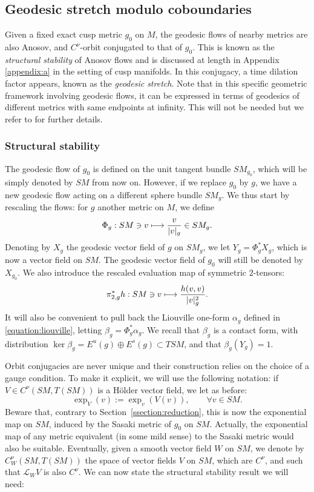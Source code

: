 \documentclass[JEP,XML,SOM,Unicode,NoFloatCountersInSection]{cedram}
\newcommand\mto{\mathchoice{\longmapsto}{\mapsto}{\mapsto}{\mapsto}}
\theoremstyle{plain}
\theoremstyle{definition}
\begin{document}
\subsection{Geodesic stretch modulo coboundaries} Given a fixed exact cusp metric $g_0$ on $M$, the geodesic flows of nearby metrics are also Anosov, and $C^\nu$-orbit conjugated to that of $g_0$. This is known as the \emph{structural stability} of Anosov flows and is discussed at length in Appendix \ref{appendix:a} in the setting of cusp manifolds. In this conjugacy, a time dilation factor appears, known as the \emph{geodesic stretch}. Note that in this specific geometric framework involving geodesic flows, it can be expressed in terms of geodesics of different metrics with same endpoints at infinity. This will not be needed but we refer to \cite{gromov} for further details.

\subsubsection{Structural stability} The geodesic flow of $g_0$ is defined on the unit tangent bundle $SM_{g_0}$, which will be simply denoted by $SM$ from now on. However, if we replace $g_0$ by $g$, we have a new geodesic flow acting on a different sphere bundle $SM_g$. We thus start by rescaling the flows: for $g$ another metric on $M$, we define
\[
\Phi_g : SM \owns v \mto \frac{v}{|v|_g} \in SM_g.
\]
Denoting by $X_g$ the geodesic vector field of $g$ on $SM_g$, we let $Y_g = \Phi_g^\ast X_g$, which is now a vector field on $SM$. The geodesic vector field of $g_0$ will still be denoted by $X_{g_0}$. We also introduce the rescaled evaluation map of symmetric $2$-tensors:
\[
\pi_{2,g}^\ast h : SM \owns v \mto \frac{ h(v,v)}{|v|_g^2}.
\]
It will also be convenient to pull back the Liouville one-form $\alpha_g$ defined in \eqref{equation:liouville}, letting $\beta_g = \Phi_g^\ast \alpha_g$. We recall that $\beta_g$ is a contact form, with distribution $\ker \beta_g = E^u(g) \oplus E^s(g)\subset TSM$, and that $\beta_g(Y_g) = 1$.

Orbit conjugacies are never unique and their construction relies on the choice of a gauge condition. To make it explicit, we will use the following notation: if $V\in C^\nu(SM, T(SM))$ is a H\"older vector field, we let as before:
\[
\exp_V (v) := \exp_v( V(v)), \qquad \forall v \in SM.
\]
Beware that, contrary to Section~\ref{ssection:reduction}, this is now the exponential map on $SM$, induced by the Sasaki metric of $g_0$ on $SM$. Actually, the exponential map of any metric equivalent (in some mild sense) to the Sasaki metric would also be suitable. Eventually, given a smooth vector field $W$ on $SM$, we denote by $C^\nu_W(SM, T(SM))$ the space of vector fields $V$ on $SM$, which are $C^\nu$, and such that $\mathcal{L}_W V$ is also $C^\nu$. We can now state the structural stability result we will need:
\end{document}
